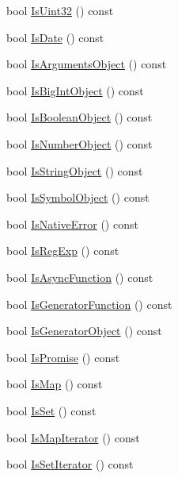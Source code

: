 \begin{DoxyCompactItemize}
\item 
bool \mbox{\hyperlink{classv8_1_1Value_ae30d50fb96b03239bc90ceb07b6e46fc}{Is\+Uint32}} () const
\item 
bool \mbox{\hyperlink{classv8_1_1Value_aa94f94744aed4d5e731eacf52c8b4801}{Is\+Date}} () const
\item 
bool \mbox{\hyperlink{classv8_1_1Value_addd71e0247ca7e8055dafdf196542b0b}{Is\+Arguments\+Object}} () const
\item 
bool \mbox{\hyperlink{classv8_1_1Value_a33927dad98e669f53f2fed83d68a24a6}{Is\+Big\+Int\+Object}} () const
\item 
bool \mbox{\hyperlink{classv8_1_1Value_a4cc64a2761fa8ed852007a2c35ecde8a}{Is\+Boolean\+Object}} () const
\item 
bool \mbox{\hyperlink{classv8_1_1Value_a497018ef8c5ed946e1c0c30554bad3f8}{Is\+Number\+Object}} () const
\item 
bool \mbox{\hyperlink{classv8_1_1Value_a32054145eadf3b1a3f900dcd52110e2b}{Is\+String\+Object}} () const
\item 
bool \mbox{\hyperlink{classv8_1_1Value_a1d5507f09734f8062a0d0a9a78496b2a}{Is\+Symbol\+Object}} () const
\item 
bool \mbox{\hyperlink{classv8_1_1Value_a7dc01ab1db65640f774366e8ecab91df}{Is\+Native\+Error}} () const
\item 
bool \mbox{\hyperlink{classv8_1_1Value_a010aa78e7cc8e1dbb878479e534992b3}{Is\+Reg\+Exp}} () const
\item 
bool \mbox{\hyperlink{classv8_1_1Value_ade5685814ab387c1772e2d5dbd000735}{Is\+Async\+Function}} () const
\item 
bool \mbox{\hyperlink{classv8_1_1Value_ac0a7fcb3b244a921e5574e6f34fa9b07}{Is\+Generator\+Function}} () const
\item 
bool \mbox{\hyperlink{classv8_1_1Value_af6f2d3199fe8b5eee219ef42574293ac}{Is\+Generator\+Object}} () const
\item 
bool \mbox{\hyperlink{classv8_1_1Value_a4b0be5d9dc3a857fee9ba7dac07123e3}{Is\+Promise}} () const
\item 
bool \mbox{\hyperlink{classv8_1_1Value_a85e4e8455cbd60c9b0a1dc91030383e6}{Is\+Map}} () const
\item 
bool \mbox{\hyperlink{classv8_1_1Value_a131fc14572f31efd8e2969963564abbb}{Is\+Set}} () const
\item 
bool \mbox{\hyperlink{classv8_1_1Value_a761b2fd0aa8c2f59c879741336eb2f66}{Is\+Map\+Iterator}} () const
\item 
bool \mbox{\hyperlink{classv8_1_1Value_a908403b5e09eb5dc0087b562b01618a4}{Is\+Set\+Iterator}} () const

\end{DoxyCompactItemize}

